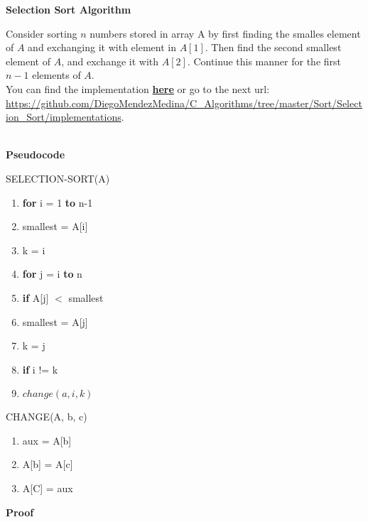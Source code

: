 \documentclass[12pt, twoside, a4paper]{article}
\begin{document}
\begin{center}
  {\large \bfseries Selection Sort Algorithm \par}
\end{center}
Consider sorting $n$ numbers stored in array A by first finding the smalles element of $A$ and exchanging it with element in $A[1]$. Then find the second
smallest element of $A$, and exchange it with $A[2]$. Continue this manner
 for the first $n-1$ elements of $A$.\\
 You can find the implementation \href{https://github.com/DiegoMendezMedina/C_Algorithms/tree/master/Sort/Selection_Sort/implementations}{\textbf{here}}
 or go to the next url: \url{https://github.com/DiegoMendezMedina/C_Algorithms/tree/master/Sort/Selection_Sort/implementations}. \\ \\
  \begin{center}
    {\large \textbf{Pseudocode} \par}
  \end{center}
  SELECTION-SORT(A)
  \begin{enumerate}
  \item \textbf{for} i = 1 \textbf{to} n-1
  \item \hspace{.5cm} smallest = A[i]
  \item \hspace{.5cm} k = i
  \item \hspace{.5cm} \textbf{for} j = i \textbf{to} n
  \item \hspace{1cm} \textbf{if} A[j] $<$ smallest
  \item \hspace{1.5cm} smallest = A[j]
  \item \hspace{1.5cm} k = j
  \item \hspace{.5cm} \textbf{if} i !=  k
  \item \hspace{1cm} $change(a, i, k)$
  \end{enumerate}
  CHANGE(A, b, c)
  \begin{enumerate}
  \item aux = A[b]
  \item A[b] = A[c]
  \item A[C] = aux
  \end{enumerate}
  \begin{center}
    \newpage
        {\large \textbf{Proof} \par}
  \end{center}
\end{document}
